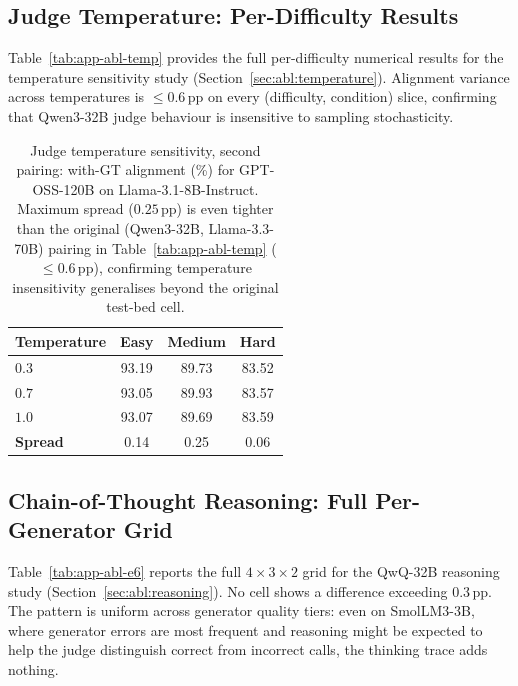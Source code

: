 \subsection*{Judge Temperature: Per-Difficulty Results}

Table~\ref{tab:app-abl-temp} provides the full per-difficulty numerical results for the temperature sensitivity study (Section~\ref{sec:abl:temperature}). Alignment variance across temperatures is $\leq 0.6$\,pp on every (difficulty, condition) slice, confirming that Qwen3-32B judge behaviour is insensitive to sampling stochasticity.

\begin{table}[h!]
\centering
\small
\setlength{\tabcolsep}{4pt}
\renewcommand{\arraystretch}{1.05}
\begin{tabular}{@{}lccc@{}}
\toprule
\textbf{Temperature} & \textbf{Easy} & \textbf{Medium} & \textbf{Hard} \\
\midrule
$0.3$ & 93.19 & 89.73 & 83.52 \\
$0.7$ & 93.05 & 89.93 & 83.57 \\
$1.0$ & 93.07 & 89.69 & 83.59 \\
\midrule
\textbf{Spread} & 0.14 & 0.25 & 0.06 \\
\bottomrule
\end{tabular}
\caption{Judge temperature sensitivity, second pairing: with-GT alignment (\%) for GPT-OSS-120B on Llama-3.1-8B-Instruct. Maximum spread ($0.25$\,pp) is even tighter than the original (Qwen3-32B, Llama-3.3-70B) pairing in Table~\ref{tab:app-abl-temp} ($\leq 0.6$\,pp), confirming temperature insensitivity generalises beyond the original test-bed cell.}
\label{tab:app-abl-temp-r2}
\end{table}


\subsection*{Chain-of-Thought Reasoning: Full Per-Generator Grid}

Table~\ref{tab:app-abl-e6} reports the full $4 \times 3 \times 2$ grid for the QwQ-32B reasoning study (Section~\ref{sec:abl:reasoning}). No cell shows a difference exceeding $0.3$\,pp. The pattern is uniform across generator quality tiers: even on SmolLM3-3B, where generator errors are most frequent and reasoning might be expected to help the judge distinguish correct from incorrect calls, the thinking trace adds nothing.



